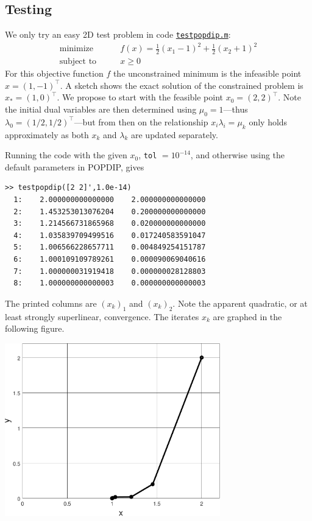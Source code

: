\documentclass[11pt]{article}
\begin{document}
\subsection*{Testing}

We only try an easy 2D test problem in code \href{http://bueler.github.io/M661F18/matlab/testpopdip.m}{\texttt{testpopdip.m}}:
\begin{equation}
\begin{matrix}
\text{minimize} \qquad & f(x) = \frac{1}{2} (x_1-1)^2 + \frac{1}{2} (x_2+1)^2 \\
\text{subject to} \qquad & x \ge 0
\end{matrix} \label{testoneproblem}
\end{equation}
For this objective function $f$ the unconstrained minimum is the infeasible point $\hat x =(1,-1)^\top$.  A sketch shows the exact solution of the constrained problem is $x_*=(1,0)^\top$.  We propose to start with the feasible point $x_0=(2,2)^\top$.  Note the initial dual variables are then determined using $\mu_0=1$---thus $\lambda_0=(1/2,1/2)^\top$---but from then on the relationship $x_i\lambda_i=\mu_k$ only holds approximately as both $x_k$ and $\lambda_k$ are updated separately.

Running the code with the given $x_0$, \texttt{tol} $=10^{-14}$, and otherwise using the default parameters in POPDIP, gives
\begin{Verbatim}[fontsize=\small]
>> testpopdip([2 2]',1.0e-14)
  1:    2.000000000000000    2.000000000000000
  2:    1.453253013076204    0.200000000000000
  3:    1.214566731865968    0.020000000000000
  4:    1.035839709499516    0.017240583591047
  5:    1.006566228657711    0.004849254151787
  6:    1.000109109789261    0.000090069040616
  7:    1.000000031919418    0.000000028128803
  8:    1.000000000000003    0.000000000000003
\end{Verbatim}
The printed columns are $(x_k)_1$ and $(x_k)_2$.  Note the apparent quadratic, or at least strongly superlinear, convergence.  The iterates $x_k$ are graphed in the following figure.

\bigskip
\begin{center}
\includegraphics[width=0.7\textwidth]{testpopdip}
\end{center}


\medskip



\end{document}
